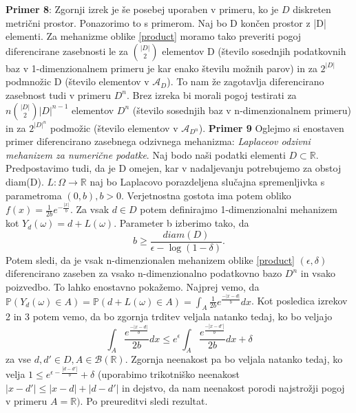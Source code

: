 \documentclass[mat1]{article}
\theoremstyle{definition}
\begin{document}
\newline
\newline
\textbf{Primer 8}: Zgornji izrek je še posebej uporaben v primeru, ko je $D$ diskreten metrični prostor. Ponazorimo to s primerom. Naj bo D končen prostor z |D| elementi. Za mehanizme oblike \eqref{product} moramo tako preveriti pogoj diferencirane zasebnosti le za $\binom{|D|}{2}$ elementov D (število sosednjih podatkovnih baz v 1-dimenzionalnem primeru je kar enako številu možnih parov) in za $2^{|D|}$ podmnožic D (število elementov v $\mathcal{A}_D$). To nam že zagotavlja diferencirano zasebnost tudi v primeru $D^n$.  Brez izreka bi morali pogoj testirati za $n\binom{|D|}{2}|D|^{n-1}$ elementov $D^n$ (število sosednjih baz v n-dimenzionalnem primeru) in za $2^{|D|^n}$ podmožic (število elementov v $\mathcal{A}_{D^n}$).
\newline
\newline
\textbf{Primer 9}  Oglejmo si enostaven primer diferencirano zasebnega odzivnega mehanizma: \textit{Laplaceov odzivni mehanizem za numerične podatke}. Naj bodo naši podatki elementi $D \subset \mathbb{R}$. Predpostavimo tudi, da je D omejen, kar v nadaljevanju potrebujemo za obstoj diam(D). $L: \Omega \rightarrow \mathbb{R}$ naj bo Laplacovo porazdeljena slučajna spremenljivka s parametroma $(0,b), b > 0$.  
Verjetnostna gostota ima potem obliko $f(x)=\frac{1}{2b}e^{-\frac{|x|}{b}}$.  Za vsak $d \in D$ potem definirajmo 1-dimenzionalni mehanizem kot  $Y_{d}(\omega) = d + L(\omega)$. Parameter b izberimo tako, da 
$$b\geq \frac{diam(D)}{\epsilon - \log(1-\delta)}.$$
Potem sledi, da je vsak n-dimenzionalen mehanizem oblike \eqref{product} $(\epsilon, \delta)$ diferencirano zaseben za vsako n-dimenzionalno podatkovno bazo $D^n$ in vsako poizvedbo. To lahko enostavno pokažemo. 
\newline
\newline
Najprej vemo, da $\mathbb{P}(Y_{d}(\omega) \in A) = \mathbb{P}(d + L(\omega) \in A) = \int_{A}\frac{1}{2b}e^{\frac{-|x-d|}{b}}dx$. Kot posledica izrekov 2 in 3 potem vemo, da bo zgornja trditev veljala natanko tedaj, ko bo veljajo 
$$\int_{A}\frac{e^{\frac{-|x-d|}{b}}}{2b}dx \leq e^{\epsilon}\int_{A}\frac{e^{\frac{-|x-d'|}{b}}}{2b}dx + \delta$$
za vse $d,d' \in D, A \in \mathcal{B}(\mathbb{R})$. Zgornja neenakost pa bo veljala natanko tedaj, ko velja $1 \leq e^{\epsilon - \frac{|d-d'|}{b}} + \delta$ (uporabimo trikotniško neenakost $|x-d'| \leq |x-d| + |d -d'|$ in dejstvo, da nam neenakost porodi najstrožji pogoj v primeru $A=\mathbb{R})$. Po preureditvi sledi rezultat. 
\end{document}
